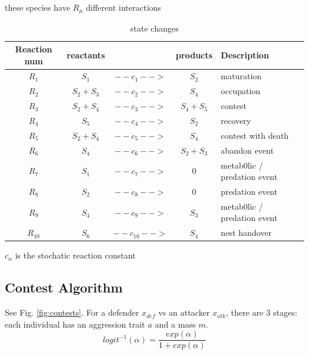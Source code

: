\documentclass[a4paper,11pt]{article}
\begin{document}
these species have $R_\mu$ different interactions
\begin{table}[h!]
    \caption{state changes}
    \centering
    \begin{tabular}{c | c | c | c | l }
        \hline
        Reaction num & reactants  & & products & Description\\
        \hline
        \hline
            $R_1$       &   $S_1$       & $--c_1-->$       &   $ S_2$      & maturation\\
            $R_2$       &   $S_2 + S_3$ & $--c_2-->$      &   $S_4 $      & occupation\\
            $R_3$       &   $S_2 + S_4$ & $--c_3-->$      &   $S_4 + S_5$ & contest\\
            $R_4$       &   $S_5$       & $--c_4-->$      &   $S_2$       & recovery\\
            $R_5$       &   $S_2 + S_4$ & $--c_5-->$      &   $S_4$       & contest with death\\
            $R_6$       &   $S_4$       & $--c_6-->$      &   $S_2 + S_3$ & abandon event\\
            $R_7$       &   $S_1$       & $--c_7-->$      &   $0$         & metab0lic / predation event\\
            $R_8$       &   $S_2$       & $--c_8-->$      &   $0$         & predation event\\
            $R_9$       &   $S_4$       & $--c_9-->$      &   $S_3$       & metab0lic / predation event\\
            $R_{10}$    &   $S_6$       & $--c_{10}-->$   &   $S_4$       & nest handover\\
        \hline
    \end{tabular}
\end{table}


$c_n$ is the stochatic reaction constant

\subsection{Contest Algorithm}
See Fig. \ref{fig:contests}.
For a defender $x_{def}$ vs an attacker $x_{atk}$, there are 3 stages:
each individual has an aggression trait $a$ and a mass $m$.
\begin{equation}\label{eq:logit}
    logit^{-1}(\alpha) = \frac{exp(\alpha)}{1 + exp(\alpha)}
\end{equation}
\end{document}
